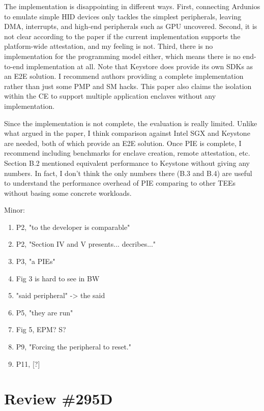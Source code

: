\documentclass[9pt]{article}
\begin{document}
The implementation is disappointing in different ways. First, connecting
Ardunios to emulate simple HID devices only tackles the simplest
peripherals, leaving DMA, interrupts, and high-end peripherals such as
GPU uncovered. Second, it is not clear according to the paper if the
current implementation supports the platform-wide attestation, and my
feeling is not. Third, there is no implementation for the programming
model either, which means there is no end-to-end implementation at all.
Note that Keystore does provide its own SDKs as an E2E solution. I
recommend authors providing a complete implementation rather than just
some PMP and SM hacks. This paper also claims the isolation within the
CE to support multiple application enclaves without any implementation.

Since the implementation is not complete, the evaluation is really
limited. Unlike what argued in the paper, I think comparison against
Intel SGX and Keystone are needed, both of which provide an E2E
solution. Once PIE is complete, I recommend including benchmarks for
enclave creation, remote attestation, etc. Section B.2 mentioned
equivalent performance to Keystone without giving any numbers. In fact,
I don't think the only numbers there (B.3 and B.4) are useful to
understand the performance overhead of PIE comparing to other TEEs
without basing some concrete workloads.

Minor:

\begin{enumerate}
\def\labelenumi{\arabic{enumi}.}

\item
  P2, "to the developer is comparable"
\item
  P2, "Section IV and V presents... decribes..."
\item
  P3, "a PIEs"
\item
  Fig 3 is hard to see in BW
\item
  "said peripheral" -\textgreater{} the said
\item
  P5, "they are run"
\item
  Fig 5, EPM? S?
\item
  P9, "Forcing the peripheral to reset."
\item
  P11, {[}?{]}
\end{enumerate}

\section{Review \#295D}
\end{document}
